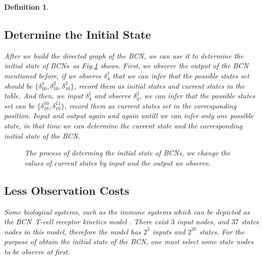 \documentclass[conference]{IEEEtran} %
\newtheorem{definition}{Definition}
\def \BCN {{\em BCN}}
\def \BCNs {{\em BCNs}}
\begin{document}
\begin{definition}
\subsection{Determine the Initial State}

After we build the directed graph of the {\em BCN}, we can use it to determine the initial state of \BCNs\ as {\em Fig.\ref{fig:5}} shows. First, we observe the output of the {\em BCN} mentioned before, if we observe $\delta_4^1$ that we can infer that the possible states set should be $\{\delta_{16}^1,\delta_{16}^2,\delta_{16}^3\}$, record them as initial states and current states in the table. And then, we input  $\delta_4^1$ and observe  $\delta_4^3$, we can infer that the possible states set can be $\{\delta_{16}^{10},\delta_{16}^{11}\}$, record them as current states set in the corresponding position. Input and output again and again untill we can infer only one  possible state, in that time we can determine the current state and the corresponding initial state of the {\em BCN}.

\begin{figure}[thpb]
      \centering
      
      \caption{The process of determing the initial state of BCNs, we change the values of current states by input and the output we observe. }
      \label{fig:5}
   \end{figure}
\subsection{Less Observation Costs}
Some biological systems, such as the immune systems which can be depicted as the \BCN\ T-cell receptor kinetics model \cite{Klamt2006A}. There exist $3$ input nodes, and $37$ states nodes in this model, therefore the model has $2^3$ inputs and $2^{37}$ states. For the purpose of obtain the initial state of the {\em BCN}, one must select some state nodes to be observe at first. 


\end{definition}
\end{document}
